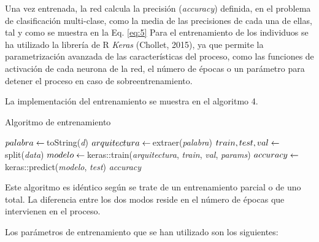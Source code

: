 \documentclass[spanish,a4paper,12pt,twoside]{report}
\begin{document}
  Una vez entrenada, la red calcula la precisión (\emph{accuracy}) definida, en el problema de clasificación multi-clase, como la media de las precisiones de cada una de ellas, tal y como se muestra en la Eq. \ref{eq:5}
  Para el entrenamiento de los individuos se ha utilizado la librería de R \emph{Keras} (Chollet, 2015), ya que permite la parametrización avanzada de las características del proceso, como las funciones de activación de cada neurona de la red, el número de épocas o un parámetro para detener el proceso en caso de sobreentrenamiento. \par
  La implementación del entrenamiento se muestra en el algoritmo 4. \par
  \begin{algorithm}[H]
    \caption{Algoritmo de entrenamiento}\label{entren}
    \begin{algorithmic}[1]
       
        \State $palabra \gets \thinspace $toString(\textit{d}) 
        \State $arquitectura \gets \thinspace $extraer(\textit{palabra})
        \State $train, test, val \gets \thinspace $split(\textit{data})
        \State $modelo \gets \thinspace $keras::train(\textit{arquitectura}, \textit{train}, \textit{val}, \textit{params})
        \State $accuracy \gets \thinspace $keras::predict(\textit{modelo}, \textit{test})
        \State \Return \textit{accuracy}
      \EndFunction
    \end{algorithmic}
  \end{algorithm}
  Este algoritmo es idéntico según se trate de un entrenamiento parcial o de uno total. La diferencia entre los dos modos reside en el número de épocas que intervienen en el proceso. \par
  Los parámetros de entrenamiento que se han utilizado son los siguientes: \par
\end{document}
